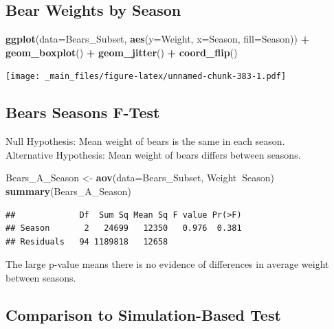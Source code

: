 \documentclass[]{book}
\newenvironment{Shaded}{\begin{snugshade}}{\end{snugshade}}
\newcommand{\KeywordTok}[1]{\textcolor[rgb]{0.13,0.29,0.53}{\textbf{#1}}}
\newcommand{\DataTypeTok}[1]{\textcolor[rgb]{0.13,0.29,0.53}{#1}}
\newcommand{\StringTok}[1]{\textcolor[rgb]{0.31,0.60,0.02}{#1}}
\newcommand{\OperatorTok}[1]{\textcolor[rgb]{0.81,0.36,0.00}{\textbf{#1}}}
\newcommand{\NormalTok}[1]{#1}
\begin{document}
\subsection{Bear Weights by Season}\label{bear-weights-by-season-1}

\begin{Shaded}
\begin{Highlighting}[]
\KeywordTok{ggplot}\NormalTok{(}\DataTypeTok{data=}\NormalTok{Bears_Subset, }\KeywordTok{aes}\NormalTok{(}\DataTypeTok{y=}\NormalTok{Weight, }\DataTypeTok{x=}\NormalTok{Season, }\DataTypeTok{fill=}\NormalTok{Season)) }\OperatorTok{+}\StringTok{ }
\StringTok{   }\KeywordTok{geom_boxplot}\NormalTok{() }\OperatorTok{+}\StringTok{ }\KeywordTok{geom_jitter}\NormalTok{() }\OperatorTok{+}\StringTok{ }\KeywordTok{coord_flip}\NormalTok{()}
\end{Highlighting}
\end{Shaded}

\texttt{[image: \_main\_files/figure-latex/unnamed-chunk-383-1.pdf]}

\subsection{Bears Seasons F-Test}\label{bears-seasons-f-test}

Null Hypothesis: Mean weight of bears is the same in each season.\\
Alternative Hypothesis: Mean weight of bears differs between seasons.

\begin{Shaded}
\begin{Highlighting}[]
\NormalTok{Bears_A_Season <-}\StringTok{ }\KeywordTok{aov}\NormalTok{(}\DataTypeTok{data=}\NormalTok{Bears_Subset, Weight}\OperatorTok{~}\NormalTok{Season)}
\KeywordTok{summary}\NormalTok{(Bears_A_Season)}
\end{Highlighting}
\end{Shaded}

\begin{verbatim}
##             Df  Sum Sq Mean Sq F value Pr(>F)
## Season       2   24699   12350   0.976  0.381
## Residuals   94 1189818   12658
\end{verbatim}

The large p-value means there is no evidence of differences in average
weight between seasons.

\subsection{Comparison to Simulation-Based
Test}\label{comparison-to-simulation-based-test}
\end{document}
